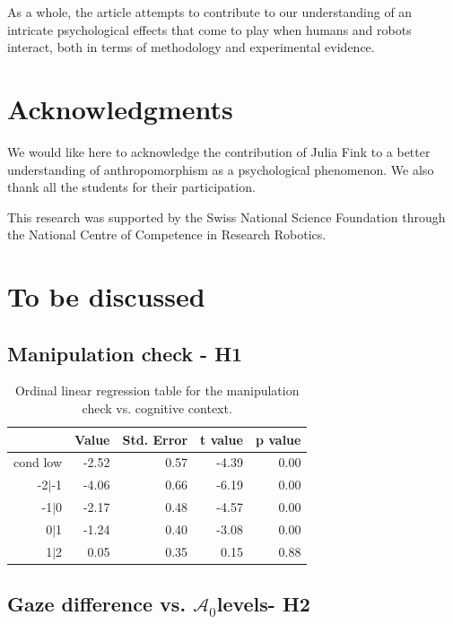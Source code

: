 \documentclass[lettersize, noapacite, twoside, HRI]{apa_HRI}
\newcommand{\anti}{{$\mathcal{A}_0$\xspace}}
\begin{document}
As a whole, the article attempts to contribute to our understanding of an
intricate psychological effects that come to play when humans and robots
interact, both in terms of methodology and experimental evidence.


\section*{Acknowledgments}

We would like here to acknowledge the contribution of Julia Fink to a better
understanding of anthropomorphism as a psychological phenomenon. We also thank
all the students for their participation.

This research was supported by the Swiss National Science Foundation through the
National Centre of Competence in Research Robotics.

\newpage


\section {To be discussed}


\subsection{Manipulation check - H1}


\begin{table}[ht]
\caption{Ordinal linear regression table for the manipulation check vs. cognitive context.}
\centering
\begin{tabular}{rrrrr}
  \hline
 & Value & Std. Error & t value & p value \\ 
  \hline
cond low & -2.52 & 0.57 & -4.39 & 0.00 \\ 
  -2$|$-1 & -4.06 & 0.66 & -6.19 & 0.00 \\ 
  -1$|$0 & -2.17 & 0.48 & -4.57 & 0.00 \\ 
  0$|$1 & -1.24 & 0.40 & -3.08 & 0.00 \\ 
  1$|$2 & 0.05 & 0.35 & 0.15 & 0.88 \\ 
   \hline
\end{tabular}
\end{table}



\subsection{Gaze difference vs. \anti levels- H2}
\end{document}
